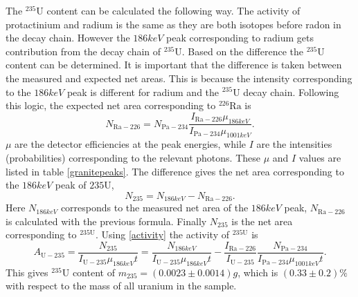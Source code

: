 \documentclass[pdftex,12pt,a4paper]{article}
\begin{document}
		The $^{235}\text{U}$ content can be calculated the following way. The activity of protactinium and radium is the same as they are both isotopes before radon in the decay chain. However the $186keV$ peak corresponding to radium gets contribution from the decay chain of $^{235}\text{U}$. Based on the difference the $^{235}\text{U}$ content can be determined. It is important that the difference is taken between the measured and expected net areas. This is because the intensity corresponding to the $186keV$ peak is different for radium and the $^{235}\text{U}$ decay chain. Following this logic, the expected net area corresponding to $^{226}\text{Ra}$ is
		\begin{equation}
			N_{\text{Ra}-226} = N_{\text{Pa}-234}\frac{I_{\text{Ra}-226}\mu_{186keV}}{I_{\text{Pa}-234}{\mu_{1001keV}}}.
		\end{equation}
		$\mu$ are the detector efficiencies at the peak energies, while $I$ are the intensities (probabilities) corresponding to the relevant photons. These $\mu$ and $I$ values are listed in table \ref{granitepeaks}. The difference gives the net area corresponding to the $186keV$ peak of ${235\text{U}}$,
		\begin{equation}
			N_{235} = N_{186keV} - N_{\text{Ra}-226}.
		\end{equation}
		Here $N_{186keV}$ corresponds to the measured net area of the $186keV$ peak, $N_{\text{Ra}-226}$ is calculated with the previous formula. Finally $N_{235}$ is the net area corresponding to $^{235\text{U}}$. Using \eqref{activity} the activity of $^{235\text{U}}$ is
		\begin{equation}
			A_{\text{U}-235} = \frac{N_{235}}{I_{\text{U}-235}\mu_{186keV} t} = \frac{N_{186keV}}{I_{\text{U}-235}\mu_{186keV} t} - \frac{I_{\text{Ra}-226}}{I_{\text{U}-235}}\frac{N_{\text{Pa}-234}}{I_{\text{Pa}-234}\mu_{1001keV} t}.
		\end{equation}
		This gives $^{235}\text{U}$ content of $m_{235} = (0.0023\pm0.0014)g$, which is $(0.33\pm0.2)\%$ with respect to the mass of all uranium in the sample.
\end{document}
